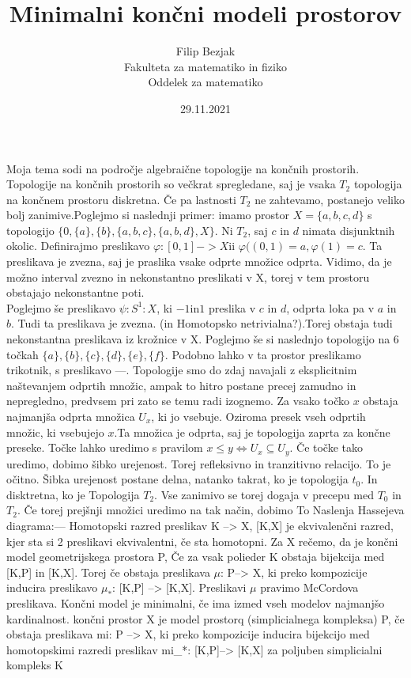 \documentclass[a4paper,12pt]{article}
\title{Minimalni končni modeli prostorov}
\author{Filip Bezjak \\
Fakulteta za matematiko in fiziko \\ Oddelek za matematiko}
\date{29.11.2021}
\begin{document}
\maketitle

Moja tema sodi na področje algebraične topologije na končnih prostorih. Topologije na končnih prostorih so večkrat spregledane, saj je vsaka $T_2$ topologija
na končnem prostoru diskretna. Če pa lastnosti $T_2$ ne zahtevamo, postanejo veliko bolj 
zanimive.Poglejmo si naslednji primer: imamo prostor $X = \{a,b,c,d\}$ s topologijo 
$\{0,\{a\}, \{b\}, \{a,b,c\}, \{a,b,d\},  X\}$. Ni $T_2$, saj $c$ in $d$ nimata disjunktnih okolic.
Definirajmo preslikavo $ \varphi :[0,1] -> X$ii $ \varphi ((0,1) = a, \varphi (1) = c$.
Ta preslikava je zvezna, saj je praslika vsake odprte množice odprta. Vidimo, da je
možno interval zvezno in nekonstantno preslikati v X, torej v tem prostoru obstajajo
nekonstantne poti. \\Poglejmo še preslikavo $\psi : S^1 : X$, ki $-1 $in$1$ preslika v
$c$ in $d$, odprta loka pa v $a$ in $b$. Tudi ta preslikava je zvezna. (in Homotopsko
netrivialna?).Torej obstaja tudi nekonstantna preslikava iz krožnice v X.
Poglejmo še si naslednjo topologijo na 6 točkah $\{a\},\{b\},\{c\},\{d\},\{e\},\{f\}$.
Podobno lahko v ta prostor preslikamo trikotnik, s preslikavo ---. Topologije smo do zdaj 
navajali z eksplicitnim naštevanjem odprtih množic, ampak to hitro postane precej zamudno 
in nepregledno, predvsem pri zato se temu radi izognemo.
Za vsako točko $x$ obstaja najmanjša odprta množica $U_x$, ki jo vsebuje. Oziroma 
presek vseh odprtih množic, ki vsebujejo $x$.Ta množica je odprta, saj je topologija 
zaprta za končne preseke. Točke lahko uredimo s pravilom $ x\le y \Leftrightarrow U_x 
\subseteq  U_y$. Če točke tako uredimo, dobimo šibko urejenost. Torej refleksivno in 
tranzitivno relacijo. To je očitno. Šibka urejenost postane delna, natanko takrat, ko 
je topologija $t_0$. In disktretna, ko je Topologija $T_2$. Vse zanimivo se torej dogaja
v precepu med $T_0$ in $T_2$. Če torej prejšnji množici uredimo na tak način, dobimo To
Naslenja Hassejeva diagrama:---
Homotopski razred preslikav K --> X, [K,X] je ekvivalenčni razred, kjer sta si 2 preslikavi ekvivalentni,
če sta homotopni. Za X rečemo, da je končni model geometrijskega prostora P, Če za vsak polieder
K obstaja bijekcija med [K,P] in [K,X]. Torej če obstaja preslikava $\mu$: P--> X, ki preko kompozicije
inducira preslikavo $\mu_*$: [K,P] --> [K,X]. Preslikavi $\mu$ pravimo McCordova preslikava.
Končni model je minimalni, če ima izmed vseh modelov najmanjšo kardinalnost.
končni prostor X je model prostorq (simplicialnega
kompleksa) P, če obstaja preslikava mi: P --> X, ki preko kompozicije inducira bijekcijo med homotopskimi
razredi preslikav mi_*: [K,P]--> [K,X] za poljuben simplicialni kompleks K
\end{document}
